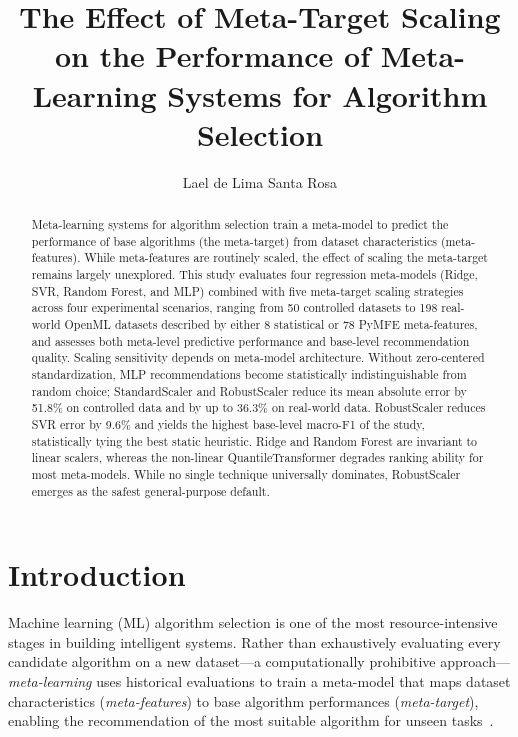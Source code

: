 \documentclass[12pt]{article}
\title{The Effect of Meta-Target Scaling on the Performance of Meta-Learning Systems for Algorithm Selection}
\author{Lael de Lima Santa Rosa\inst{1}}
\begin{document}
\maketitle

\begin{abstract}
Meta-learning systems for algorithm selection train a meta-model to predict the performance of base algorithms (the meta-target) from dataset characteristics (meta-features). While meta-features are routinely scaled, the effect of scaling the meta-target remains largely unexplored. This study evaluates four regression meta-models (Ridge, SVR, Random Forest, and MLP) combined with five meta-target scaling strategies across four experimental scenarios, ranging from 50 controlled datasets to 198 real-world OpenML datasets described by either 8 statistical or 78 PyMFE meta-features, and assesses both meta-level predictive performance and base-level recommendation quality. Scaling sensitivity depends on meta-model architecture. Without zero-centered standardization, MLP recommendations become statistically indistinguishable from random choice; StandardScaler and RobustScaler reduce its mean absolute error by 51.8\% on controlled data and by up to 36.3\% on real-world data. RobustScaler reduces SVR error by 9.6\% and yields the highest base-level macro-F1 of the study, statistically tying the best static heuristic. Ridge and Random Forest are invariant to linear scalers, whereas the non-linear QuantileTransformer degrades ranking ability for most meta-models. While no single technique universally dominates, RobustScaler emerges as the safest general-purpose default.
\end{abstract}

\section{Introduction}

Machine learning (ML) algorithm selection is one of the most resource-intensive stages in building intelligent systems. Rather than exhaustively evaluating every candidate algorithm on a new dataset---a computationally prohibitive approach---\textit{meta-learning} uses historical evaluations to train a meta-model that maps dataset characteristics (\textit{meta-features}) to base algorithm performances (\textit{meta-target}), enabling the recommendation of the most suitable algorithm for unseen tasks~\cite{vanschoren2018meta}.
\end{document}
